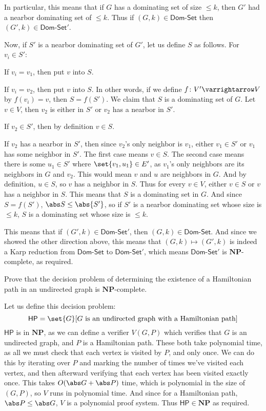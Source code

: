 \documentclass[10pt]{article}
\let\to=\varrightarrow
\def\domset{\textsf{Dom-Set}}
\def\hp{\mathsf{HP}}
\def\NP{\mathbf{NP}}
\begin{document}
In particular, this means that if $G$ has a dominating set of size $\leq k$, then $G'$ had a nearbor dominating set of $\leq k$.
Thus if $(G,k)\in\domset$ then $(G',k)\in\domset'$.

Now, if $S'$ is a nearbor dominating set of $G'$, let us define $S$ as follows.
For $v_i\in S'$:
\benum
    \item If $v_i=v_1$, then put $v$ into $S$.
    \item If $v_i=v_2$, then put $v$ into $S$.
\eenum
In other words, if we define $f\colon V'\to V$ by $f(v_i)=v$, then $S=f(S')$.
We claim that $S$ is a dominating set of $G$.
Let $v\in V$, then $v_2$ is either in $S'$ or $v_2$ has a nearbor in $S'$.
\benum
    \item If $v_2\in S'$, then by definition $v\in S$.
    \item If $v_2$ has a nearbor in $S'$, then since $v_2$'s only neighbor is $v_1$, either $v_1\in S'$ or $v_1$ has some neighbor in $S'$.
    The first case means $v\in S$.
    The second case means there is some $u_1\in S'$ where $\set{v_1,u_1}\in E'$, as $v_1$'s only neighbors are its neighbors in $G$ and $v_2$.
    This would mean $v$ and $u$ are neighbors in $G$.
    And by definition, $u\in S$, so $v$ has a neighbor in $S$.
\eenum
Thus for every $v\in V$, either $v\in S$ or $v$ has a neighbor in $S$.
This means that $S$ is a dominating set in $G$.
And since $S=f(S')$, $\abs S\leq\abs{S'}$, so if $S'$ is a nearbor dominating set whose size is $\leq k$, $S$ is a dominating set whose size is $\leq k$.

This means that if $(G',k)\in\domset'$, then $(G,k)\in\domset$.
And since we showed the other direction above, this means that $(G,k)\mapsto(G',k)$ is indeed a Karp reduction from $\domset$ to $\domset'$, which means $\domset'$ is $\NP$-complete, as required.

\begin{exercise*}

    Prove that the decision problem of determining the existence of a Hamiltonian path in an undirected graph is $\NP$-complete.

\end{exercise*}

Let us define this decision problem:
\[ \hp = \set{G}[\text{$G$ is an undirected graph with a Hamiltonian path}] \]
$\hp$ is in $\NP$, as we can define a verifier $V(G,P)$ which verifies that $G$ is an undirected graph, and $P$ is a Hamiltonian path.
These both take polynomial time, as all we must check that each vertex is visited by $P$, and only once.
We can do this by iterating over $P$ and marking the number of times we've visited each vertex, and then afterward verifying that each vertex has been visited exactly once.
This takes $O(\abs G+\abs P)$ time, which is polynomial in the size of $(G,P)$, so $V$ runs in polynomial time.
And since for a Hamiltonian path, $\abs P\leq\abs G$, $V$ is a polynomial proof system.
Thus $\hp\in\NP$ as required.
\end{document}
